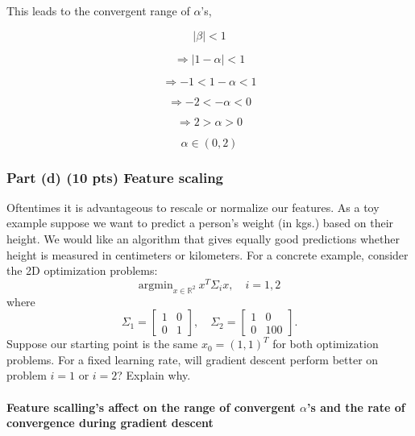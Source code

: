 \documentclass[11pt]{article}
\begin{document}
    This leads to the convergent range of \(\alpha\)'s,

\[
|\beta| < 1
\]

\[
\Rightarrow |1 - \alpha| < 1
\]

\[
\Rightarrow -1 < 1 - \alpha < 1
\]

\[
\Rightarrow -2 < - \alpha < 0
\]

\[
\Rightarrow 2 > \alpha > 0
\]

\[
\alpha \in (0,2)
\]

    \hypertarget{part-d-10-pts-feature-scaling}{%
\subsubsection{Part (d) (10 pts) Feature
scaling}\label{part-d-10-pts-feature-scaling}}

Oftentimes it is advantageous to rescale or normalize our features. As a
toy example suppose we want to predict a person's weight (in kgs.) based
on their height. We would like an algorithm that gives equally good
predictions whether height is measured in centimeters or kilometers. For
a concrete example, consider the 2D optimization problems: \[
\mathrm{argmin}_{x\in \mathbb{R}^2}\ x^T \Sigma_i x, \quad i = 1,2
\] where \[
\Sigma_1 = \begin{bmatrix}
1 & 0\\
0 & 1
\end{bmatrix}, \quad 
\Sigma_2 = \begin{bmatrix}
1 & 0\\
0 & 100
\end{bmatrix}.
\] Suppose our starting point is the same \(x_0 = (1, 1)^T\) for both
optimization problems. For a fixed learning rate, will gradient descent
perform better on problem \(i=1\) or \(i=2\)? Explain why.

    \hypertarget{feature-scallings-affect-on-the-range-of-convergent-alphas-and-the-rate-of-convergence-during-gradient-descent}{%
\paragraph{\texorpdfstring{Feature scalling's affect on the range of
convergent \(\alpha\)'s and the rate of convergence during gradient
descent}{Feature scalling's affect on the range of convergent \textbackslash{}alpha's and the rate of convergence during gradient descent}}\label{feature-scallings-affect-on-the-range-of-convergent-alphas-and-the-rate-of-convergence-during-gradient-descent}}
\end{document}
